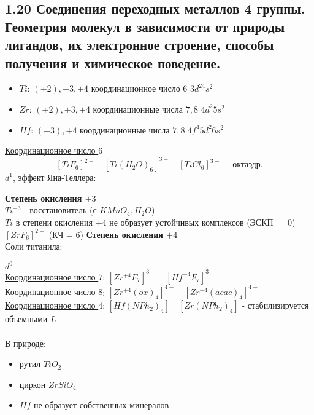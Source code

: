 \subsection{1.20 Соединения переходных металлов 4 группы. Геометрия молекул в зависимости от природы лигандов, их электронное строение, способы получения и химическое поведение.}
\begin{itemize}
	\item $Ti$: $(+2), +3, +4$ \quad координационное число $6$ \quad $3d^24s^2$
	\item $Zr$: $(+2), +3, +4$ \quad координационные числа $7, 8$ \quad $4d^2 5s^2$
	\item $Hf$: $(+3), +4$ \quad координационные числа $7, 8$ \quad $4f^4 5d^2 6s^2$
\end{itemize}
\ul{Координационное число $6$}
\[
\left[TiF_6 \right]^{2-} \quad \left[Ti(H_2O)_6 \right]^{3+} \quad \left[TiCl_6 \right]^{3-} \quad \text{ октаэдр.}
\]
$d^1$, эффект Яна-Теллера:
\begin{figure} [H]
\end{figure}
\textbf{Степень окисления $+3$} \\
$Ti^{+3}$ - восстановитель (с $KMnO_4, H_2O$) \\
$Ti$ в степени окисления $+4$ не образует устойчивых комплексов (ЭСКП $= 0$) \\
$ \left[ZrF_6 \right]^{2-} $ (КЧ = $6$)
\textbf{Степень окисления $+4$} \\
Соли титанила:
\begin{figure} [H]
	\centering {\texttt{[image: aa1]}}
\end{figure}
$d^0$ \\
\ul{Координационное число $7$}: $ \left[Zr^{+4}F_7 \right]^{3-} \quad \left[Hf^{+4}F_7 \right]^{3-} $ \\
\ul{Координационное число $8$}: $ \left[Zr^{+4}(ox)_4 \right]^{4-} \quad \left[Zr^{+4}(acac)_4 \right]^{4-} $ \\
\ul{Координационное число $4$}: $ \left[Hf(NPh_2)_4 \right] \quad \left[Zr(NPh_2)_4 \right] $ - стабилизируется объемными $L$ \\ \\
В природе:
\begin{itemize}
	\item рутил $TiO_2$
	\item циркон $ZrSiO_4$
	\item $Hf$ не образует собственных минералов
\end{itemize}
